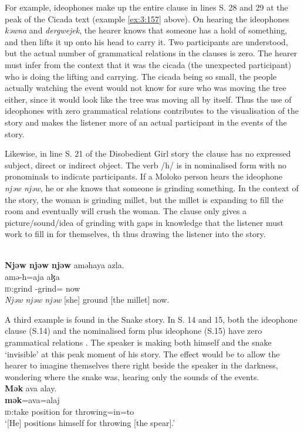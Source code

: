 {For example, ideophones make up the entire clause in lines S. 28 and 29 at the peak of the Cicada text (example  \ref{ex:3:157} above). On hearing the ideophones \textit{kəwna} and \textit{dergwejek}, the hearer knows that someone has a hold of something, and then lifts it up onto his head to carry it. Two participants are understood, but the actual number of grammatical relations in the clauses is zero. The hearer must infer from the context that it was the cicada (the unexpected participant) who is doing the lifting and carrying. The cicada being so small, the people actually watching the event would not know for sure who was moving the tree either, since it would look like the tree was moving all by itself. Thus the use of ideophones with zero grammatical relations contributes to the visualisation of the story and makes the listener more of an actual participant in the events of the story. 

Likewise, in line S. 21 of the Disobedient Girl story  the clause has no expressed subject, direct or indirect object. The verb /h/ is in nominalised form with no pronominals to indicate participants. If a Moloko person hears the ideophone \textit{njəw njəw}, he or she knows that someone is grinding something. In the context of the story, the woman is grinding millet, but the millet is expanding to fill the room and eventually will crush the woman. The clause only gives a picture/sound/idea of grinding with gaps in knowledge that the listener must work to fill in for themselves, th thus drawing the listener into the story.


\ea \label{ex:3:159}\\
\textbf{Njəw  njəw  njəw}  aməhaya  azla.\\
           amə-h=aja     aɮa\\
      \textsc{id}:grind             {\DEP}-grind={\PLU}    now\\
\glt  \textit{Njəw  njəw  njəw} [she] ground [the millet] now. 
\z

A third example is found in the Snake story. In S. 14 and 15, both the ideophone clause (S.14) and the nominalised form plus ideophone (S.15) have zero grammatical relations . The speaker is making both himself and the snake ‘invisible’ at this peak moment of his story. The effect would be to allow the hearer to imagine themselves there right beside the speaker in the darkness, wondering where the snake was, hearing only the sounds of the events. 
\clearpage
\ea \label{ex:3:160}\\
\textbf{Mək}  ava  alay.\\
\gll  \textbf{mək}=ava=alaj\\
      {\textsc{id}:take position for throwing}=in=to\\
\glt  ‘[He] positions himself for throwing [the spear].’

}
